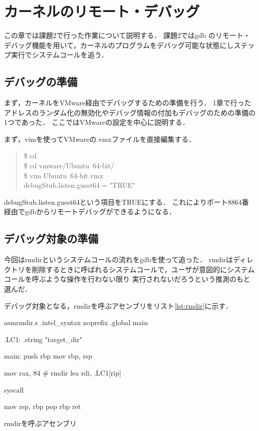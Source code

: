 \chapter{カーネルのリモート・デバッグ}
この章では課題2で行った作業について説明する．
課題2ではgdb のリモート・デバッグ機能を用いて，カーネルのプログラムをデバッグ可能な状態にしステップ実行でシステムコールを追う．

\section{デバッグの準備}
まず，カーネルをVMware経由でデバッグするための準備を行う．
1章で行ったアドレスのランダム化の無効化やデバッグ情報の付加もデバッグのための準備の1つであった．
ここではVMwareの設定を中心に説明する．

まず，vimを使ってVMwareの.vmxファイルを直接編集する．
\begin{quote}
\$ cd  \\
\$ cd vmware/Ubuntu\ 64-bit/ \\
\$ vim Ubuntu\ 64-bit.vmx \\
debugStub.listen.guest64 = "TRUE"
\end{quote}

debugStub.listen.guest64という項目をTRUEにする．
これによりポート8864番経由でgdbからリモートデバッグができるようになる．

\section{デバッグ対象の準備}
今回はrmdirというシステムコールの流れをgdbを使って追った．
rmdirはディレクトリを削除するときに呼ばれるシステムコールで，ユーザが意図的にシステムコールを呼ぶような操作を行わない限り
実行されないだろうという推測のもと選んだ．

デバッグ対象となる，rmdirを呼ぶアセンブリをリスト\ref{lst:rmdir}に示す．
\begin{longlisting}
\begin{myminted}{asm}{rmdir.s}
.intel_syntax noprefix
.global main

.LC1:
    .string "target_dir"

main:
    push rbp
    mov rbp, rsp

    mov rax, 84 # rmdir
    lea rdi, .LC1[rip]

    syscall

    mov rsp, rbp
    pop rbp
    ret
\end{myminted}
    \caption{rmdirを呼ぶアセンブリ}
\label{lst:rmdir}
\end{longlisting}

